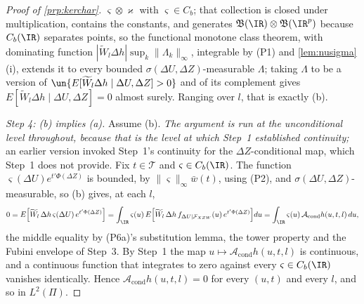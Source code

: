 \begin{proof}[Proof of \cref{prp:kerchar}]
$\varsigma\otimes\varkappa$ with $\varsigma\in C_b$; that collection is closed under multiplication, contains
the constants, and generates $\mathfrak B(\IR)\otimes\mathfrak B(\IR^{p})$ because $C_b(\IR)$ separates
points, so the functional monotone class theorem, with dominating function
$|\widetilde W_l\Delta h|\sup_k\|\Lambda_k\|_\infty$, integrable by (P1) and \cref{lem:nusigma}(i), 
extends it to every bounded $\sigma(\Delta U,\Delta Z)$-measurable $\Lambda$; taking $\Lambda$ to be a
version of $\un\{E[\widetilde W_l\Delta h\mid\Delta U,\Delta Z]>0\}$ and of its complement gives
$E[\widetilde W_l\Delta h\mid\Delta U,\Delta Z]=0$ almost surely. Ranging over $l$, that is exactly (b).

\emph{Step 4: (b) implies (a).}
Assume (b). \emph{The argument is run at the unconditional level throughout, because that is the level at
which Step~1 established continuity;} an earlier version invoked Step~1's continuity for the
$\Delta Z$-conditional map, which Step~1 does not provide. Fix $t\in\mathcal T$ and
$\varsigma\in C_b(\IR)$. The function $\varsigma(\Delta U)e^{t'\Phi(\Delta Z)}$ is bounded, by
$\|\varsigma\|_\infty\bar w(t)$, using (P2), and $\sigma(\Delta U,\Delta Z)$-measurable, so (b) gives,
at each $l$,
\[
0=E\Big[\widetilde W_l\,\Delta h\,\varsigma(\Delta U)\,e^{t'\Phi(\Delta Z)}\Big]
=\int_{\IR}\varsigma(u)\,E\Big[\widetilde W_l\,\Delta h\,f_{\Delta U\mid\mathcal F_{XZW}}(u)\,e^{t'\Phi(\Delta Z)}\Big]du
=\int_{\IR}\varsigma(u)\,\mathcal A_{\mathrm{cond}}h(u,t,l)\,du ,
\]
the middle equality by (P6a)'s substitution lemma, the tower property and the Fubini envelope of Step~3.
By Step~1 the map $u\mapsto\mathcal A_{\mathrm{cond}}h(u,t,l)$ is continuous, and a continuous function
that integrates to zero against every $\varsigma\in C_b(\IR)$ vanishes identically. Hence
$\mathcal A_{\mathrm{cond}}h(u,t,l)=0$ for every $(u,t)$ and every $l$, and so in $L^{2}(\Pi)$.


\end{proof}
